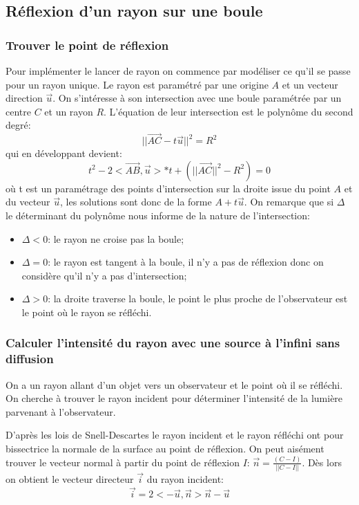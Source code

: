 \documentclass[11pt,a4paper]{article}
\begin{document}
\subsection{Réflexion d'un rayon sur une boule}

\subsubsection{Trouver le point de réflexion}

Pour implémenter le lancer de rayon on commence par modéliser ce qu'il se passe pour un rayon unique. Le rayon est paramétré par une origine $A$ et un vecteur direction $\vec{u}$. On s'intéresse à son intersection avec une boule paramétrée par un centre $C$ et un rayon $R$. L'équation de leur intersection est le polynôme du second degré:
\[\vert \vert \vec{AC} - t \vec{u}\vert \vert^2 = R^2\]
qui en développant devient:
\[t^2-2<\vec{AB},\vec{u}>*t+(\vert\vert \vec{AC}\vert\vert^2-R^2) = 0\]
où t est un paramétrage des points d'intersection sur la droite issue du point $A$ et du vecteur $\vec{u}$, les solutions sont donc de la forme $A+t\vec{u}$. On remarque que si $\Delta$ le déterminant du polynôme nous informe de la nature de l'intersection:
\begin{itemize}
\item $\Delta < 0$: le rayon ne croise pas la boule;
\item $\Delta = 0$: le rayon est tangent à la boule, il n'y a pas de réflexion donc on considère qu'il n'y a pas d'intersection;
\item $\Delta > 0$: la droite traverse la boule, le point le plus proche de l'observateur est le point où le rayon se réfléchi.
\end{itemize}

\subsubsection{Calculer l'intensité du rayon avec une source à l'infini sans diffusion}

On a un rayon allant d'un objet vers un observateur et le point où il se réfléchi. On cherche à trouver le rayon incident pour déterminer l'intensité de la lumière parvenant à l'observateur.

D'après les lois de Snell-Descartes le rayon incident et le rayon réfléchi ont pour bissectrice la normale de la surface au point de réflexion. On peut aisément trouver le vecteur normal  à partir du point de réflexion $I$: $\vec{n} = \frac{(C-I)}{\vert\vert C-I\vert\vert}$. Dès lors on obtient le vecteur directeur $\vec{i}$ du rayon incident:
\[\vec{i}=2<-\vec{u},\vec{n}>\vec{n}-\vec{u}\]
\end{document}
